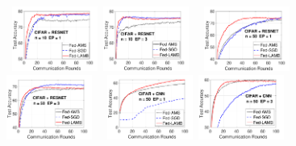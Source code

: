 \documentclass[twoside]{article}
\begin{document}
\begin{figure}[t]
    \begin{center}
        \mbox{
        \hspace{-0.05in}\includegraphics[width=0.25\textwidth]{new_figure/cifar_testerror_resnet_ep1_client10_iid1_SGD.pdf}
        \hspace{-0.13in} \includegraphics[width=0.25\textwidth]{new_figure/cifar_testerror_resnet_ep3_client10_iid1_SGD.pdf}
        }
        \mbox{
        \hspace{-0.05in}\includegraphics[width=0.25\textwidth]{new_figure/cifar_testerror_resnet_ep1_client50_iid1_SGD.pdf}
        \hspace{-0.1in}\includegraphics[width=0.25\textwidth]{new_figure/cifar_testerror_resnet_ep3_client50_iid1_SGD.pdf}
        }
         \mbox{        
         \hspace{-0.05in}\includegraphics[width=0.25\textwidth]{new_figure/cifar_testerror_cnn_ep1_client50_iid1.pdf}
         \hspace{-0.1in}\includegraphics[width=0.25\textwidth]{new_figure/cifar_testerror_cnn_ep3_client50_iid1.pdf}
}
\end{center}
\end{figure}
\end{document}
